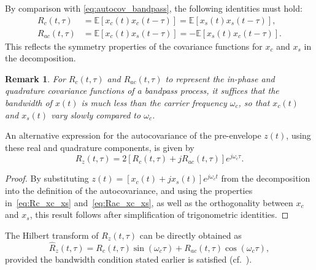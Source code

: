 \documentclass[12pt]{article}
\newtheorem{remark}{Remark}[section]
\begin{document}
By comparison with \eqref{eq:autocov_bandpass}, the following identities must hold:
\begin{align}
R_c(t,\tau) &= \mathbb{E}[x_c(t)x_c(t-\tau)] = \mathbb{E}[x_s(t)x_s(t-\tau)], \label{eq:Rc_xc_xs} \\
R_{ac}(t,\tau) &= \mathbb{E}[x_c(t)x_s(t-\tau)] = -\mathbb{E}[x_s(t)x_c(t-\tau)]. \label{eq:Rac_xc_xs}
\end{align}
This reflects the symmetry properties of the covariance functions for $x_c$ and $x_s$ in the decomposition.

\begin{remark}
For $R_c(t, \tau)$ and $R_{ac}(t, \tau)$ to represent the in-phase and quadrature covariance functions of a bandpass process, it suffices that the bandwidth of $x(t)$ is much less than the carrier frequency $\omega_c$, so that $x_c(t)$ and $x_s(t)$ vary slowly compared to $\omega_c$.
\end{remark}

An alternative expression for the autocovariance of the pre-envelope $z(t)$, using these real and quadrature components, is given by
\begin{equation}
R_z(t, \tau) = 2 \left[ R_c(t, \tau) + j R_{ac}(t, \tau) \right] e^{j\omega_c \tau}.
\label{eq:final_autocov}
\end{equation}
\begin{proof}
By substituting $z(t) = [x_c(t) + j x_s(t)]e^{j\omega_c t}$ from the decomposition into the definition of the autocovariance, and using the properties in~\eqref{eq:Rc_xc_xs} and~\eqref{eq:Rac_xc_xs}, as well as the orthogonality between $x_c$ and $x_s$, this result follows after simplification of trigonometric identities.
\end{proof}

The Hilbert transform of $R_z(t, \tau)$ can be directly obtained as
\begin{equation}
\hat{R}_z(t, \tau) = R_c(t, \tau) \sin(\omega_c \tau) + R_{ac}(t, \tau) \cos(\omega_c \tau),
\label{eq:hilbert_autocov_bandpass}
\end{equation}
provided the bandwidth condition stated earlier is satisfied (cf.~\cite{urkowitz1962}).
\end{document}
